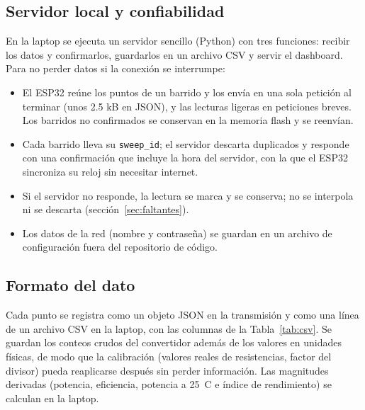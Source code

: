 \documentclass[10pt,letterpaper,twocolumn]{article}
\begin{document}
\subsection{Servidor local y confiabilidad}
En la laptop se ejecuta un servidor sencillo (Python) con tres funciones: recibir los datos y confirmarlos, guardarlos en un archivo CSV y servir el dashboard. Para no perder datos si la conexión se interrumpe:
\begin{itemize}
\item El ESP32 reúne los puntos de un barrido y los envía en una sola petición al terminar (unos 2.5 kB en JSON), y las lecturas ligeras en peticiones breves. Los barridos no confirmados se conservan en la memoria flash y se reenvían.
\item Cada barrido lleva su \texttt{sweep\_id}; el servidor descarta duplicados y responde con una confirmación que incluye la hora del servidor, con la que el ESP32 sincroniza su reloj sin necesitar internet.
\item Si el servidor no responde, la lectura se marca y se conserva; no se interpola ni se descarta (sección~\ref{sec:faltantes}).
\item Los datos de la red (nombre y contraseña) se guardan en un archivo de configuración fuera del repositorio de código.
\end{itemize}

\subsection{Formato del dato}
Cada punto se registra como un objeto JSON en la transmisión y como una línea de un archivo CSV en la laptop, con las columnas de la Tabla~\ref{tab:csv}. Se guardan los conteos crudos del convertidor además de los valores en unidades físicas, de modo que la calibración (valores reales de resistencias, factor del divisor) pueda reaplicarse después sin perder información. Las magnitudes derivadas (potencia, eficiencia, potencia a 25~\textdegree C e índice de rendimiento) se calculan en la laptop.
\end{document}
